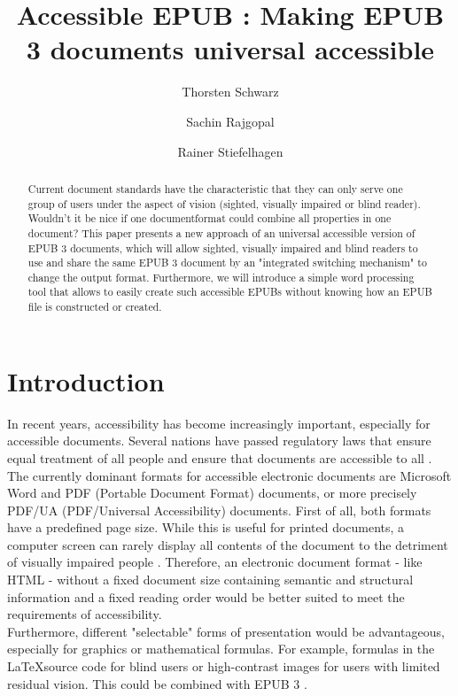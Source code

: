\documentclass[runningheads,a4paper]{llncs}
\title{Accessible EPUB : Making EPUB 3 documents universal accessible}
\author{Thorsten Schwarz \and Sachin Rajgopal \and Rainer Stiefelhagen}
\institute{Karlsruhe Institute of Technology, Studycentre for the Visually Impaired, Engesserstr. 4, 76131 Karlsruhe, Germany\\
\email{thorsten.schwarz@kit.edu},\\ WWW home page:
\texttt{http://szs.kit.edu}
}
\begin{document}
\maketitle

\begin{abstract}
Current document standards have the characteristic that they can only serve one group of users under the aspect of vision (sighted, visually impaired or blind reader). Wouldn't it be nice if one documentformat could combine all properties in one document? 
This paper presents a new approach of an universal accessible version of EPUB 3 documents, which will allow sighted, visually impaired and blind readers to use and share the same EPUB 3 document by an "integrated switching mechanism" to change the output format. Furthermore, we will introduce a simple word processing tool that allows to easily create such accessible EPUBs without knowing how an EPUB file is constructed or created. 
\end{abstract}

\section{Introduction}
In recent years, accessibility has become increasingly important, especially for accessible documents. Several nations have passed regulatory laws that ensure equal treatment of all people and ensure that documents are accessible to all \cite{webaim}.\\
The currently dominant formats for accessible electronic documents are Microsoft Word and PDF (Portable Document Format) documents, or more precisely PDF/UA (PDF/Universal Accessibility) documents. First of all, both formats have a predefined page size. While this is useful for printed documents, a computer screen can rarely display all contents of the document to the detriment of visually impaired people \cite{EPUBzone}. Therefore, an electronic document format - like HTML - without a fixed document size containing semantic and structural information and a fixed reading order would be better suited to meet the requirements of accessibility.\\
Furthermore, different "selectable" forms of presentation would be advantageous, especially for graphics or mathematical formulas. For example, formulas in the \LaTeX source code for blind users or high-contrast images for users with limited residual vision. This could be combined with EPUB 3 \cite{EPUBzone}.
\end{document}
